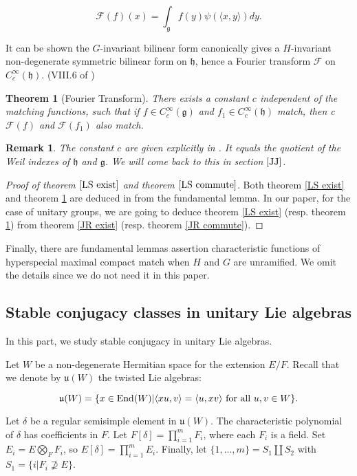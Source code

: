\documentclass[11pt, oneside,reqno]{amsart}   	%
\newtheorem{theorem}{Theorem}[section]
\newtheorem*{remark}{Remark}
\begin{document}
$$\mathcal{F}(f)(x)=\int_{\mathfrak{g}}f(y)\psi(\langle x, y \rangle)dy.$$

It can be shown the $G$-invariant bilinear form canonically gives a $H$-invariant non-degenerate symmetric bilinear form on $\mathfrak{h}$, hence a Fourier transform $\mathcal{F}$ on $C_c^\infty(\mathfrak{h})$. (VIII.6 of \cite{Wa1})

\begin{theorem}[Fourier Transform] \label{LS commute}
There exists a constant $c$ independent of the matching functions, such that if $f \in C_c^\infty(\mathfrak{g})$ and $f_1 \in C_c^\infty(\mathfrak{h})$ match, then c$\mathcal{F}(f)$ and $\mathcal{F}(f_1)$ also match.
\end{theorem}
\begin{remark}
The constant $c$ are given explicitly in \cite{Wa2}. It equals the quotient of the Weil indexes of $\mathfrak{h}$ and $\mathfrak{g}$. We will come back to this in section $\ref{JJ}$. 
\end{remark}

\begin{proof}[Proof of theorem $\ref{LS exist}$ and theorem $\ref{LS commute}$]
Both theorem \ref{LS exist} and theorem \ref{LS commute} are deduced in \cite{Wa2} from the fundamental lemma. In our paper, for the case of unitary groups, we are going to deduce theorem \ref{LS exist} (resp. theorem \ref{LS commute})  from theorem \ref{JR exist} (resp. theorem \ref{JR commute}).
\end{proof}


Finally, there are fundamental lemmas assertion characteristic functions of hyperspecial maximal compact match when $H$ and $G$ are unramified. We omit the details since we do not need it in this paper.  


\subsection{Stable conjugacy classes in unitary Lie algebras} \label{stable}

In this part, we study stable conjugacy in unitary Lie algebras. 

Let $W$ be a non-degenerate Hermitian space for the extension $E/F$. Recall that we denote by $\mathfrak{u}(W)$ the twisted Lie algebras: 

$$\mathfrak{u}(W)=\{x \in \textup{End}(W)|\langle xu , v\rangle=\langle u , xv\rangle \textup{ for all }u,v \in W \}.$$

Let $\delta$ be a regular semisimple element in $\mathfrak{u}(W).$ The characteristic polynomial of $\delta$ has coefficients in $F$. Let $F[\delta]=\prod_{i=1}^m F_i$, where each $F_i$ is a field. Set $E_i=E \bigotimes_F F_i$, so $E[\delta]=\prod_{i=1}^m E_i$. Finally, let $\{1,...,m\}=S_1\coprod S_2$ with $S_1=\{i|F_i \nsupseteq E\}$.
\end{document}
